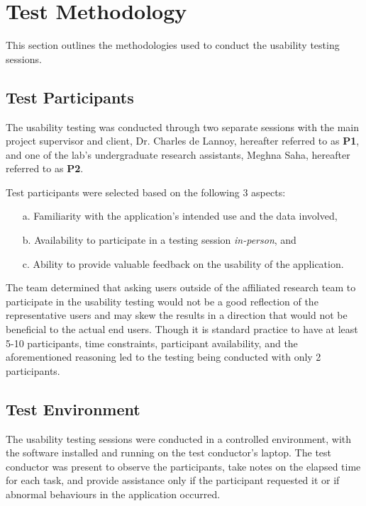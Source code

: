 \documentclass{article}
\begin{document}
\section{Test Methodology}
This section outlines the methodologies used to conduct the usability testing
sessions. 

\subsection{Test Participants}
The usability testing was conducted through two separate sessions with the
main project supervisor and client, Dr. Charles de Lannoy, hereafter referred
to as \textbf{P1}, and one of the lab's undergraduate research assistants, Meghna Saha,
hereafter referred to as \textbf{P2}.

Test participants were selected based on the following 3 aspects:
\begin{itemize}
    \item[a.] Familiarity with the application's intended use and the data involved,
    \item[b.] Availability to participate in a testing session \emph{in-person}, and
    \item[c.] Ability to provide valuable feedback on the usability of the
    application.
\end{itemize}

The team determined that asking users outside of the affiliated research team to
participate in the usability testing would not be a good reflection of the
representative users and may skew the results in a direction that would not be
beneficial to the actual end users. Though it is standard practice to have at
least 5-10 participants, time constraints, participant availability, and the
aforementioned reasoning led to the testing being conducted with only 2
participants.

\subsection{Test Environment}
The usability testing sessions were conducted in a controlled environment, with
the software installed and running on the test conductor's laptop. The test
conductor was present to observe the participants, take notes on the elapsed
time for each task, and provide assistance only if the participant requested it
or if abnormal behaviours in the application occurred.
\end{document}
